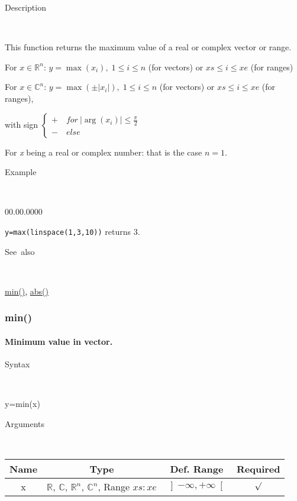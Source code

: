 \begin{description}
\item [Description]~
\end{description}
This function returns the maximum value of a real or complex vector
or range.

\medskip{}
For $x\in$$\mathbb{R}^{n}$: $y=$$\max\left(x_{i}\right),\;1\leq i\leq n$
(for vectors) or $xs\leq i\leq xe$ (for ranges)
\medskip{}

For $x\in\mathbb{C}^{n}$: $y=\max\left(\pm\left|x_{i}\right|\right),\;1\leq i\leq n$
(for vectors) or $xs\leq i\leq xe$ (for ranges),

with sign $\left\{ \begin{array}{l}
+\quad for\:\left|\arg\left(x_{i}\right)\right|\leq\frac{\pi}{2}\\
-\quad else\end{array}\right.$
\medskip{}

For \textit{x} being a real or complex number: that is the
case $n=1$.

\begin{description}
\item [Example]~
\end{description}
\begin{lyxlist}{00.00.0000}
\item [\texttt{y=max(linspace(1,3,10))}]returns 3.
\end{lyxlist}
\begin{description}
\item [See~also]~
\end{description}
\textcolor{blue}{\hyperlink{min}{min()}}\textcolor{black}{,} \textcolor{blue}{\hyperlink{abs}{abs()}}


\newpage
\subsubsection*{\hypertarget{min}{}{\Large min()}}


\paragraph{\label{par:Minimum}Minimum value in vector.}

\begin{description}
\item [Syntax]~
\end{description}
y=min(x)

\begin{description}
\item [Arguments]~
\end{description}
\begin{tabular}{|c|c|c|c|}
\hline 
Name&
Type&
Def. Range&
Required\tabularnewline
\hline
\hline 
x&
$\mathbb{R}$, $\mathbb{C}$, $\mathbb{R}^{n}$, $\mathbb{C}^{n}$,
Range $xs:xe$&
$\left]-\infty,+\infty\right[$&
$\surd$\tabularnewline
\hline
\end{tabular}

